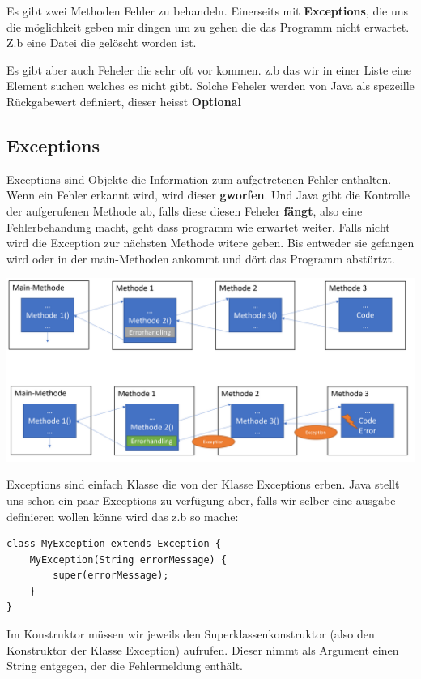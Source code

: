 \documentclass[12pt]{article}
\begin{document}
    Es gibt zwei Methoden Fehler zu behandeln. Einerseits mit \textbf{Exceptions}, die uns die möglichkeit geben mir 
    dingen um zu gehen die das Programm nicht erwartet. Z.b eine Datei die gelöscht worden ist. 

    Es gibt aber auch Feheler die sehr oft vor kommen. z.b das wir in einer Liste eine Element suchen welches es nicht gibt. 
    Solche Feheler werden von Java als spezeille Rückgabewert definiert, dieser heisst \textbf{Optional}

    \subsection*{Exceptions}

    Exceptions sind Objekte die Information zum aufgetretenen Fehler enthalten. Wenn ein Fehler erkannt wird, wird dieser
    \textbf{gworfen}. Und Java gibt die Kontrolle der aufgerufenen Methode ab, falls diese diesen Feheler \textbf{fängt}, also eine 
    Fehlerbehandung macht, geht dass programm wie erwartet weiter. Falls nicht wird die Exception zur nächsten Methode witere geben. 
    Bis entweder sie gefangen wird oder in der main-Methoden ankommt und dört das Programm abstürtzt. 


        \includegraphics[width=1\textwidth]{pics/fehlerBehandlung.png}

    Exceptions sind einfach Klasse die von der Klasse Exceptions erben. 
    Java stellt uns schon ein paar Exceptions zu verfügung aber, falls wir selber eine ausgabe 
    definieren wollen könne wird das z.b so mache:

    \begin{lstlisting}
class MyException extends Exception {
    MyException(String errorMessage) {
        super(errorMessage);
    }
}
    \end{lstlisting}

    Im Konstruktor müssen wir jeweils den Superklassenkonstruktor (also den Konstruktor der Klasse Exception) aufrufen.
    Dieser nimmt als Argument einen String entgegen, der die Fehlermeldung enthält.
\end{document}
